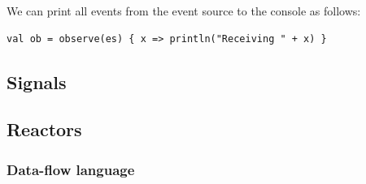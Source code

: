 We can print all events from the event source to the console as follows:
\begin{lstlisting}
val ob = observe(es) { x => println("Receiving " + x) }
\end{lstlisting}

\subsection{Signals}

\subsection{Reactors}

\subsubsection{Data-flow language}




















